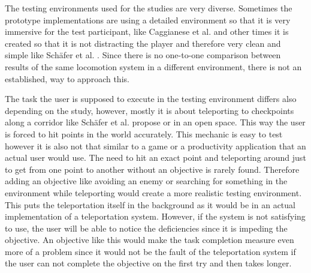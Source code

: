 The testing environments used for the studies are very diverse. Sometimes the prototype implementations are using a detailed environment so that it is very immersive for the test participant, like Caggianese et al. \cite{Caggianese} and other times it is created so that it is not distracting the player and therefore very clean and simple like Schäfer et al. \cite{Schafer2021}.  
Since there is no one-to-one comparison between results of the same locomotion system in a different environment, there is not an established, way to approach this.

The task the user is supposed to execute in the testing environment differs also depending on the study, however, mostly it is about teleporting to checkpoints along a corridor like Schäfer et al. \cite{Schafer2021} propose or in an open space.
This way the user is forced to hit points in the world accurately. This mechanic is easy to test however it is also not that similar to a game or a productivity application that an actual user would use. The need to hit an exact point and teleporting around just to get from one point to another without an objective is rarely found. Therefore adding an objective like avoiding an enemy or searching for something in the environment while teleporting would create a more realistic testing environment. This puts the teleportation itself in the background as it would be in an actual implementation of a teleportation system. However, if the system is not satisfying to use, the user will be able to notice the deficiencies since it is impeding the objective. An objective like this would make the task completion measure even more of a problem since it would not be the fault of the teleportation system if the user can not complete the objective on the first try and then takes longer. 

